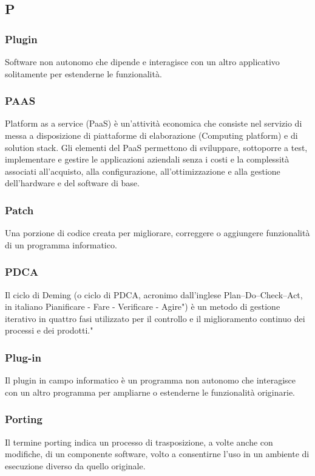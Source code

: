 \subsection*{\textbf{\hfill \Huge{P} \hfill}} 

\subsubsection*{Plugin}
Software non autonomo che dipende e interagisce con un altro applicativo solitamente per estenderne le funzionalità.

\subsubsection*{PAAS}
Platform as a service (PaaS) è un'attività economica che consiste nel servizio di messa a disposizione di piattaforme di elaborazione (Computing platform) e di solution stack. Gli elementi del PaaS permettono di sviluppare, sottoporre a test, implementare e gestire le applicazioni aziendali senza i costi e la complessità associati all'acquisto, alla configurazione, all'ottimizzazione e alla gestione dell'hardware e del software di base.
\subsubsection*{Patch}
Una porzione di codice creata per migliorare, correggere o aggiungere funzionalità di un programma informatico.
\subsubsection*{PDCA}
Il ciclo di Deming (o ciclo di PDCA, acronimo dall'inglese Plan–Do–Check–Act, in italiano Pianificare - Fare - Verificare - Agire") è un metodo di gestione iterativo in quattro fasi utilizzato per il controllo e il miglioramento continuo dei processi e dei prodotti."
\subsubsection*{Plug-in}
Il plugin in campo informatico è un programma non autonomo che interagisce con un altro programma per ampliarne o estenderne le funzionalità originarie.
\subsubsection*{Porting}
Il termine porting indica un processo di trasposizione, a volte anche con modifiche, di un componente software, volto a consentirne l'uso in un ambiente di esecuzione diverso da quello originale.
